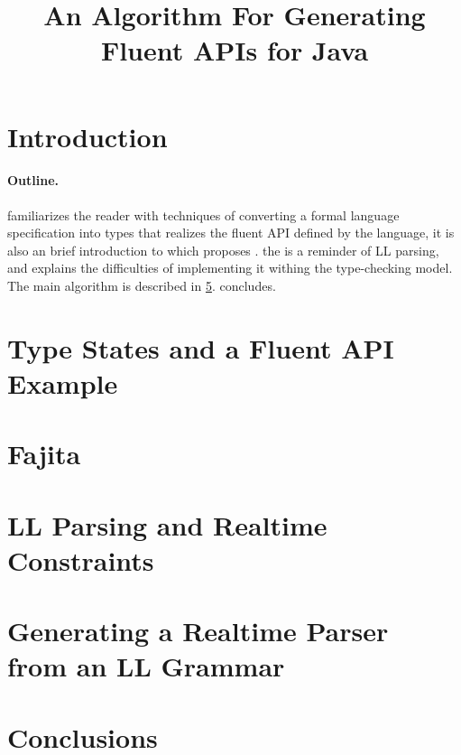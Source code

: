 \documentclass[nonatbib,preprint,numbers]{sigplanconf}
\title
{%
  An Algorithm For Generating Fluent APIs for  Java 
}
\begin{document}
\maketitle

\begin{abstract}
  
\end{abstract}

\section{Introduction}


\paragraph{Outline.}  familiarizes the reader with
techniques of converting a formal language specification into \Java types that
realizes the fluent API defined by the language, it is also an brief introduction to
 which proposes \Fajita.  the is
a reminder of LL parsing, and explains the difficulties of implementing it
withing the \Java type-checking model.  The main algorithm is described in
\cref{section:algorithm}.   concludes.

\section{Type States and a Fluent API Example}
\label{section:example}


\section{Fajita}
\label{section:fajita}


\section{LL Parsing and Realtime Constraints}
\label{section:intuition}


\section{Generating a Realtime Parser \\ from an LL Grammar}
\label{section:algorithm}


\section{Conclusions}
\label{section:zz}


\small

\end{document}
